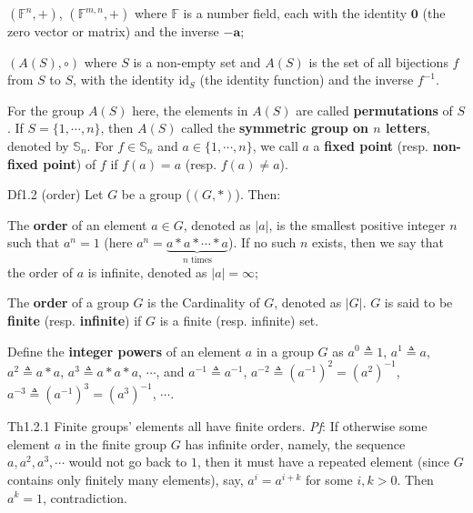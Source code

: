 \documentclass{article}
\begin{document}
\begin{Rmk}{}
\begin{compactenum}
{\begin{compactenum}
            \item $(\mathbb{F}^n, +)$, $(\mathbb{F}^{m,n}, +)$ where $\mathbb{F}$ is a number field, each with the identity $\mathbf{0}$ (the zero vector or matrix) and the inverse $-\mathbf{a}$;
            \item $(A(S), \circ)$ where $S$ is a non-empty set and $A(S)$ is the set of all bijections $f$ from $S$ to $S$, with the identity $\text{id}_S$ (the identity function) and the inverse $f^{-1}$.
        \end{compactenum}}
        \textcolor{Df}{For the group $A(S)$ here, the elements in $A(S)$ are called \textbf{permutations} of $S$. If $S = \{1, \cdots, n\}$, then $A(S)$ called the \textbf{symmetric group on $n$ letters}, denoted by $\mathbb{S}_n$.} \textcolor{Df}{For $f\in\mathbb{S}_n$ and $a\in\{1,\cdots,n\}$, we call $a$ a \textbf{fixed point} (resp. \textbf{non-fixed point}) of $f$ if $f(a) = a$ (resp. $f(a) \neq a$).}
    \end{compactenum}
\end{Rmk}

\begin{Df}{Df1.2 (order)}
    Let $G$ be a group ($(G, \ast)$). Then:
    \begin{compactenum}
        \item The \textbf{order} of an element $a\in G$, denoted as $|a|$, is the smallest positive integer $n$ such that $a^n=1$ (here $a^n = \underbrace{a\ast a\ast \cdots \ast a}_{n\text{ times}}$). If no such $n$ exists, then we say that the order of $a$ is infinite, denoted as $|a|=\infty$;
        \item The \textbf{order} of a group $G$ is the Cardinality of $G$, denoted as $|G|$. $G$ is said to be \textbf{finite} (resp. \textbf{infinite}) if $G$ is a finite (resp. infinite) set.
    \end{compactenum}
\end{Df}

\begin{Rmk}{}
    \textcolor{Df}{Define the \textbf{integer powers} of an element $a$ in a group $G$ as $a^0\triangleq 1$, $a^1\triangleq a$, $a^2\triangleq a\ast a$, $a^3\triangleq a\ast a\ast a$, $\cdots$, and $a^{-1}\triangleq a^{-1}$, $a^{-2}\triangleq (a^{-1})^2 = (a^2)^{-1}$, $a^{-3}\triangleq (a^{-1})^3 = (a^3)^{-1}$, $\cdots$.}
\end{Rmk}

\begin{Th}{Th1.2.1}
    Finite groups' elements all have finite orders.
    \tcblower
    \textit{Pf}: If otherwise some element $a$ in the finite group $G$ has infinite order, namely, the sequence $a, a^2, a^3, \cdots$ would not go back to $1$, then it must have a repeated element (since $G$ contains only finitely many elements), say, $a^i=a^{i+k}$ for some $i, k>0$. Then $a^k = 1$, contradiction.
\end{Th}
\end{document}
